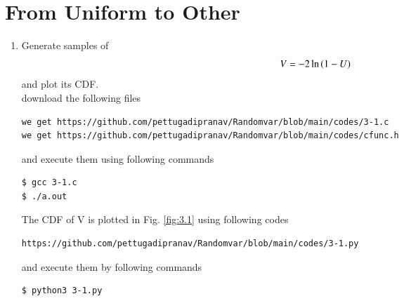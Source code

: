 \documentclass[journal,12pt,twocolumn]{IEEEtran}
\renewcommand\thesection{\arabic{section}}
\begin{document}
\section{From Uniform to Other}
\begin{enumerate}[label=\thesection.\arabic*
,ref=\thesection.\theenumi]
%
\item
Generate samples of 
%
\begin{equation}
V = -2\ln\left(1-U\right)
\end{equation}
%
and plot its CDF.  \\
\solution download the following files
\begin{lstlisting}
we get https://github.com/pettugadipranav/Randomvar/blob/main/codes/3-1.c
we get https://github.com/pettugadipranav/Randomvar/blob/main/codes/cfunc.h
\end{lstlisting}
and execute them using following commands
\begin{lstlisting}
$ gcc 3-1.c
$ ./a.out
\end{lstlisting}
The CDF of V is plotted in Fig.  \ref{fig:3.1}  using following codes
\begin{lstlisting}
https://github.com/pettugadipranav/Randomvar/blob/main/codes/3-1.py
\end{lstlisting}
and execute them by following commands
\begin{lstlisting}
$ python3 3-1.py
\end{lstlisting}


\end{enumerate}
\end{document}

